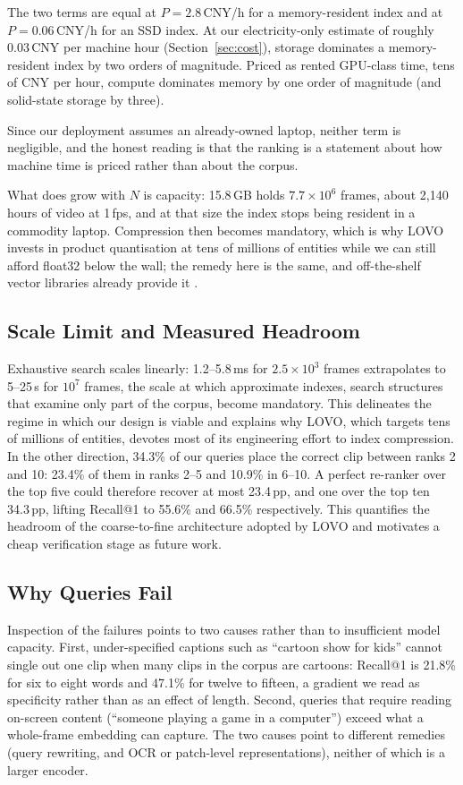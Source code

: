 \documentclass[journal]{IEEEtran}
\begin{document}
The two terms are equal at $P=2.8$\,CNY/h for a
memory-resident index and at $P=0.06$\,CNY/h for an SSD index. At our electricity-only estimate of
roughly 0.03\,CNY per machine hour (Section~\ref{sec:cost}), storage
dominates a memory-resident index by two orders of magnitude. Priced as rented GPU-class time, tens
of CNY per hour, compute dominates memory by one order of magnitude (and solid-state storage by
three). 

Since our deployment assumes an
already-owned laptop, neither term is negligible, and the honest reading is that the ranking is a
statement about how machine time is priced rather than about the corpus. 

What does grow with $N$ is
capacity: 15.8\,GB holds $7.7\times10^{6}$ frames, about 2{,}140 hours of video at 1\,fps, and at
that size the index stops being resident in a commodity laptop.
Compression then becomes mandatory, which is why LOVO invests in product quantisation at
tens of millions of entities while we can still afford float32 below the wall; the remedy here is the
same, and off-the-shelf vector libraries already provide it \cite{johnson2019faiss}.

\subsection{Scale Limit and Measured Headroom}\label{sec:scale}
Exhaustive search scales linearly: 1.2--5.8\,ms for $2.5\times10^{3}$ frames extrapolates to
5--25\,s for $10^{7}$ frames, the scale at which approximate indexes, search structures that examine only part of the corpus, become mandatory. This
delineates the regime in which our design is viable and explains why LOVO, which targets tens of
millions of entities, devotes most of its engineering effort to index compression. In the other
direction, 34.3\% of our queries place the correct clip between ranks 2 and 10: 23.4\% of them in ranks 2--5 and 10.9\% in 6--10. A perfect re-ranker over the top five could therefore
recover at most 23.4\,pp, and one over the top ten 34.3\,pp, lifting Recall@1 to 55.6\% and
66.5\% respectively. This quantifies the headroom of the
coarse-to-fine architecture adopted by LOVO and motivates a cheap verification stage as future
work.

\subsection{Why Queries Fail}
Inspection of the failures points to two causes rather than to insufficient model capacity. First,
under-specified captions such as ``cartoon show for kids'' cannot single out one clip when many
clips in the corpus are cartoons: Recall@1 is 21.8\% for six to eight words and 47.1\% for twelve
to fifteen, a gradient we read as specificity rather than as an effect of length. Second, queries that require reading on-screen content (``someone playing a game in a
computer'') exceed what a whole-frame embedding can capture. The two causes point to different remedies (query rewriting, and OCR or patch-level representations), neither of which is a
larger encoder.
\end{document}
